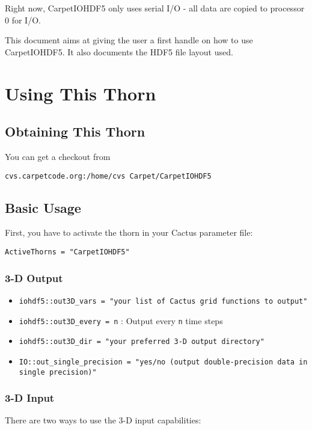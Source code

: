 Right now, CarpetIOHDF5 only uses serial I/O - all data are copied to processor 0 for I/O.

This document aims at giving the user a first handle on how to use
CarpetIOHDF5. It also documents the HDF5 file layout used.


\section{Using This Thorn}


\subsection{Obtaining This Thorn}

You can get a checkout from 

{\tt cvs.carpetcode.org:/home/cvs Carpet/CarpetIOHDF5}

\subsection{Basic Usage}

First, you have to activate the thorn in your Cactus parameter file:

{\tt ActiveThorns = "CarpetIOHDF5"}

\subsubsection{3-D Output}

\begin{itemize}
  \item {\tt iohdf5::out3D\_vars = "your list of Cactus grid functions to output"}
  \item {\tt iohdf5::out3D\_every = n} : Output every {\tt n} time steps
  \item {\tt iohdf5::out3D\_dir = "your preferred 3-D output directory"}
  \item {\tt IO::out\_single\_precision = "yes/no (output double-precision data in single precision)"}
\end{itemize}

\subsubsection{3-D Input}

There are two ways to use the 3-D input capabilities:

